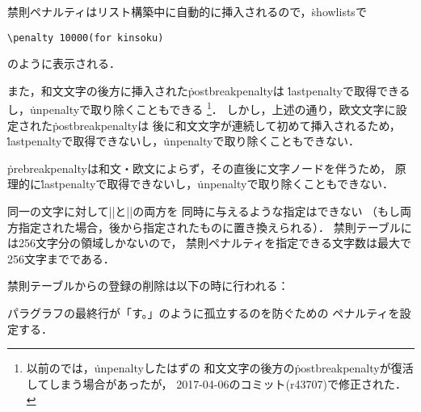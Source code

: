 \documentclass[a4paper,11pt,nomag,dvipdfmx]{jsarticle}
\def\_{\leavevmode\vrule width .45em height -.2ex depth .3ex\relax}
\begin{document}
\begin{dangerous}
禁則ペナルティはリスト構築中に自動的に挿入されるので，\.{showlists}で
\begin{verbatim}
\penalty 10000(for kinsoku)
\end{verbatim}
のように表示される．

また，和文文字の後方に挿入された\.{postbreakpenalty}は
\.{lastpenalty}で取得できるし，\.{unpenalty}で取り除くこともできる
\footnote{以前の\pTeX では，\.{unpenalty}したはずの
和文文字の後方の\.{postbreakpenalty}が復活してしまう場合があったが，
2017-04-06のコミット(r43707)で修正された\cite{tjb11}．}．
しかし，上述の通り，欧文文字に設定された\.{postbreakpenalty}は
後に和文文字が連続して初めて挿入されるため，
\.{lastpenalty}で取得できないし，\.{unpenalty}で取り除くこともできない．

\.{prebreakpenalty}は和文・欧文によらず，その直後に文字ノードを伴うため，
原理的に\.{lastpenalty}で取得できないし，\.{unpenalty}で取り除くこともできない．
\end{dangerous}

同一の文字に対して|\prebreakpenalty|と|\postbreakpenalty|の両方を
同時に与えるような指定はできない
（もし両方指定された場合，後から指定されたものに置き換えられる）．
禁則テーブルには256文字分の領域しかないので，
禁則ペナルティを指定できる文字数は最大で256文字までである．

禁則テーブルからの登録の削除は以下の時に行われる\cite{tjb26,build57}：

\begin{cslist}
\csitem[\.{jcharwidowpenalty}=<number>]
  パラグラフの最終行が「す。」のように孤立するのを防ぐための
  ペナルティを設定する．
\end{cslist}
\end{document}
